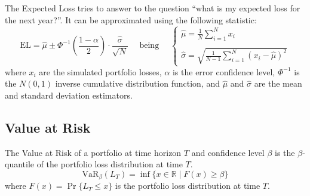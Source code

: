 \documentclass[11pt,fleqn]{book} %
\begin{document}
The Expected Loss tries to answer to the question ``what is my expected 
loss for the next year?''. It can be approximated using the following 
statistic:
\begin{displaymath}
	\text{EL} = \widehat{\mu} \pm \Phi^{-1}\left(\frac{1-\alpha}{2}\right) \cdot \frac{\widehat{\sigma}}{\sqrt{N}}
	\quad \text{ being } \quad
	\left\{
	\begin{array}{l}
		\displaystyle
		\widehat{\mu} = \frac{1}{N} \sum_{i=1}^{N} x_i \\
		\\
		\displaystyle
		\widehat{\sigma} =
		\sqrt{\frac{1}{N-1} \sum_{i=1}^{N} \left( x_i - \widehat{\mu} \right)^2}
	\end{array}
	\right.
\end{displaymath}
where $x_i$ are the simulated portfolio losses, $\alpha$ is the error 
confidence level, $\Phi^{-1}$ is the $N(0,1)$ inverse cumulative distribution 
function, and $\widehat{\mu}$ and $\widehat{\sigma}$ are the mean and standard 
deviation estimators.

\subsection{Value at Risk}

\begin{definition}
	The Value at Risk of a portfolio at time horizon $T$ and 
	confidence level $\beta$ is the $\beta$-quantile of the portfolio loss 
	distribution at time $T$.
	\begin{displaymath}
		\text{VaR}_\beta(L_T) = \inf\{x \in \mathbb{R} \mid F(x) \ge \beta \}
	\end{displaymath}
	where $F(x)=\Pr\{L_T \le x\}$ is the portfolio loss distribution at time $T$.
\end{definition}
\end{document}
